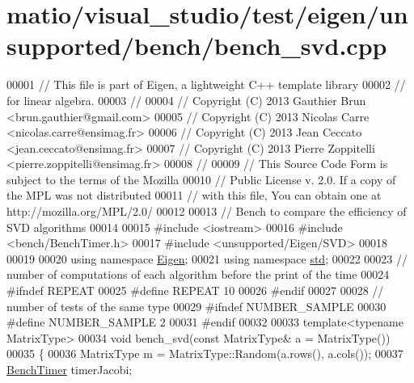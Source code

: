 \hypertarget{matio_2visual__studio_2test_2eigen_2unsupported_2bench_2bench__svd_8cpp_source}{}\section{matio/visual\+\_\+studio/test/eigen/unsupported/bench/bench\+\_\+svd.cpp}
\label{matio_2visual__studio_2test_2eigen_2unsupported_2bench_2bench__svd_8cpp_source}

\begin{DoxyCode}
00001 \textcolor{comment}{// This file is part of Eigen, a lightweight C++ template library}
00002 \textcolor{comment}{// for linear algebra.}
00003 \textcolor{comment}{//}
00004 \textcolor{comment}{// Copyright (C) 2013 Gauthier Brun <brun.gauthier@gmail.com>}
00005 \textcolor{comment}{// Copyright (C) 2013 Nicolas Carre <nicolas.carre@ensimag.fr>}
00006 \textcolor{comment}{// Copyright (C) 2013 Jean Ceccato <jean.ceccato@ensimag.fr>}
00007 \textcolor{comment}{// Copyright (C) 2013 Pierre Zoppitelli <pierre.zoppitelli@ensimag.fr>}
00008 \textcolor{comment}{//}
00009 \textcolor{comment}{// This Source Code Form is subject to the terms of the Mozilla}
00010 \textcolor{comment}{// Public License v. 2.0. If a copy of the MPL was not distributed}
00011 \textcolor{comment}{// with this file, You can obtain one at http://mozilla.org/MPL/2.0/}
00012 
00013 \textcolor{comment}{// Bench to compare the efficiency of SVD algorithms}
00014 
00015 \textcolor{preprocessor}{#include <iostream>}
00016 \textcolor{preprocessor}{#include <bench/BenchTimer.h>}
00017 \textcolor{preprocessor}{#include <unsupported/Eigen/SVD>}
00018 
00019 
00020 \textcolor{keyword}{using namespace }\hyperlink{namespace_eigen}{Eigen};
00021 \textcolor{keyword}{using namespace }\hyperlink{namespacestd}{std};
00022 
00023 \textcolor{comment}{// number of computations of each algorithm before the print of the time}
00024 \textcolor{preprocessor}{#ifndef REPEAT}
00025 \textcolor{preprocessor}{#define REPEAT 10}
00026 \textcolor{preprocessor}{#endif}
00027 
00028 \textcolor{comment}{// number of tests of the same type}
00029 \textcolor{preprocessor}{#ifndef NUMBER\_SAMPLE}
00030 \textcolor{preprocessor}{#define NUMBER\_SAMPLE 2}
00031 \textcolor{preprocessor}{#endif}
00032 
00033 \textcolor{keyword}{template}<\textcolor{keyword}{typename} MatrixType>
00034 \textcolor{keywordtype}{void} bench\_svd(\textcolor{keyword}{const} MatrixType& a = MatrixType())
00035 \{
00036   MatrixType m = MatrixType::Random(a.rows(), a.cols());
00037   \hyperlink{class_eigen_1_1_bench_timer}{BenchTimer} timerJacobi;

\end{DoxyCode}
